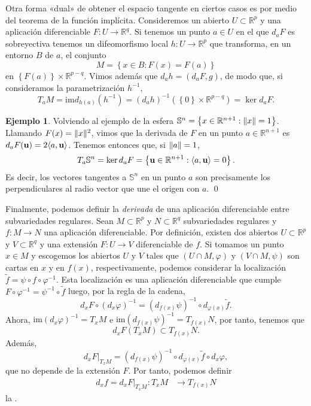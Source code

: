 \documentclass[12pt,a4paper]{book}
\theoremstyle{definition} \newtheorem{defn}[thm]{Definición}
\theoremstyle{definition} \newtheorem{ejemplo}[thm]{Ejemplo}
\theoremstyle{definition} \newtheorem{ejercicio}[thm]{Ejercicio}
\theoremstyle{remark} \newtheorem*{obs}{Observación}
\def\RR{\mathbb{R}}
\def\SF{\mathbb{S}}
\def\im{\mathrm{im}}
\newcommand{\ve}[1]{\mathbf{#1}}
\DeclarePairedDelimiter\esc{\langle}{\rangle}
\DeclarePairedDelimiter\norm{\lVert}{\rVert}
\let\emph\relax
\begin{document}
	  Otra forma «dual» de obtener el espacio tangente en ciertos casos es por medio del teorema de la función implícita. Consideremos un abierto $U\subset \RR^p$ y una aplicación diferenciable $F:U\rightarrow \RR^q$. Si tenemos un punto $a\in U$ en el que $d_aF$ es sobreyectiva tenemos un difeomorfismo local $h:U\rightarrow \RR^p$ que transforma, en un entorno $B$ de $a$, el conjunto 
	  \begin{equation*}
M=	    \left\{ x\in B: F(x)=F(a) \right\}
	  \end{equation*}
	  en $\left\{ F(a) \right\}\times \RR^{p-q}$. Vimos además que $d_ah=(d_aF, g)$, de modo que, si consideramos la parametrización $h^{-1}$,
	  \begin{equation*}
	    T_aM=\im d_{h(a)} (h^{-1}) = (d_{a}h)^{-1}(\left\{ 0 \right\}\times \RR^{p-q}) = \ker d_a F.
	  \end{equation*}

	  \begin{ejemplo}
	    Volviendo al ejemplo de la esfera $\SF^n=\left\{ x\in \RR^{n+1}: \norm{x} =1 \right\}$. Llamando $F(x)=\norm{x}^2$, vimos que la derivada de $F$ en un punto $a\in \RR^{n+1}$ es $d_aF(\ve{u})=2\esc{a,\ve{u}}$. Tenemos entonces que, si $\norm{a}=1$,
	    \begin{equation*}
	      T_a \SF^n = \ker d_a F = \left\{ \ve{u} \in \RR^{n+1}: \esc{a,\ve{u}}=0 \right\}.
	    \end{equation*}
	    Es decir, los vectores tangentes a $\SF^n$ en un punto $a$ son precisamente los perpendiculares al radio vector que une el origen con $a$.
	    \qed
	  \end{ejemplo}

	  Finalmente, podemos definir la \textit{derivada} de una aplicación diferenciable entre subvariedades regulares. Sean $M\subset \RR^p$ y $N\subset \RR^q$ subvariedades regulares y $f:M\rightarrow N$ una aplicación diferenciable. Por definición, existen dos abiertos $U\subset \RR^p$ y $V\subset \RR^q$ y una extensión $F:U\rightarrow V$ diferenciable de $f$. Si tomamos un punto $x\in M$ y escogemos los abiertos $U$ y $V$ tales que $(U\cap M,\varphi)$ y $(V\cap M,\psi)$ son cartas en $x$ y en $f(x)$, respectivamente, podemos considerar la localización $\tilde{f}=\psi\circ f \circ \varphi^{-1}$. Esta localización es una aplicación diferenciable que cumple $F \circ \varphi^{-1} =\psi^{-1}\circ \tilde{f}$ luego, por la regla de la cadena, 
	  \begin{equation*}
	    d_x F \circ (d_{x}\varphi)^{-1} = (d_{f(x)}\psi)^{-1} \circ d_{\varphi(x)}\tilde{f}.
	  \end{equation*}
	  Ahora, $\im (d_{x}\varphi)^{-1} = T_xM$ e $\im (d_{f(x)}\psi)^{-1}=T_{f(x)}N$, por tanto, tenemos que $$d_xF(T_xM)\subset T_{f(x)}N.$$ Además, 
	  \begin{equation*}
	    d_xF|_{T_xM}= (d_{f(x)}\psi)^{-1}\circ d_{\varphi(x)}\tilde{f} \circ d_x \varphi,
	  \end{equation*}
	  que no depende de la extensión $F$. Por tanto, podemos definir 
	  \begin{align*}
	    d_xf=d_xF|_{T_x M}:T_xM&\longrightarrow T_{f(x)}N 
	    \end{align*}
	   la \emph{derivada de $f$ en $x$}.
\end{document}
